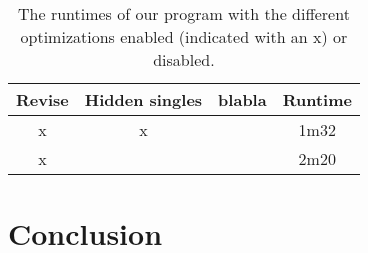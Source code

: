 \documentclass[11pt]{article} %
\begin{document}
\begin{table}
\begin{center}
\begin{tabular}{c c c c}
\hline
 Revise & Hidden singles & blabla & Runtime \\
\hline
x & x &  & 1m32\\
x &  &  & 2m20  \\
\hline
\end{tabular}
\end{center}
\caption{The runtimes of our program with the different optimizations enabled (indicated with an x) or disabled.}
\end{table}

\section{Conclusion}
\end{document}
